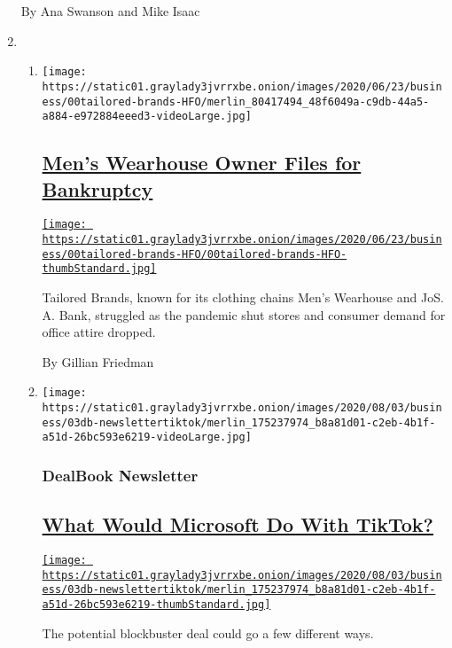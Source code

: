 \begin{enumerate}
  By Ana Swanson and Mike Isaac
\item
  \begin{enumerate}
  \def\labelenumii{\arabic{enumii}.}
  \item
    \texttt{[image: https://static01.graylady3jvrrxbe.onion/images/2020/06/23/business/00tailored-brands-HFO/merlin\_80417494\_48f6049a-c9db-44a5-a884-e972884eeed3-videoLarge.jpg]}

    \hypertarget{mens-wearhouse-owner-files-for-bankruptcy}{%
    \subsection{\texorpdfstring{\href{/2020/08/03/business/tailored-brands-mens-wearhouse-bankruptcy.html}{Men's
    Wearhouse Owner Files for
    Bankruptcy}}{Men's Wearhouse Owner Files for Bankruptcy}}\label{mens-wearhouse-owner-files-for-bankruptcy}}

    \href{/2020/08/03/business/tailored-brands-mens-wearhouse-bankruptcy.html}{\texttt{[image: https://static01.graylady3jvrrxbe.onion/images/2020/06/23/business/00tailored-brands-HFO/00tailored-brands-HFO-thumbStandard.jpg]}}

    Tailored Brands, known for its clothing chains Men's Wearhouse and
    JoS. A. Bank, struggled as the pandemic shut stores and consumer
    demand for office attire dropped.

    By Gillian Friedman
  \item
    \texttt{[image: https://static01.graylady3jvrrxbe.onion/images/2020/08/03/business/03db-newslettertiktok/merlin\_175237974\_b8a81d01-c2eb-4b1f-a51d-26bc593e6219-videoLarge.jpg]}

    \hypertarget{dealbook-newsletter}{%
    \subsubsection{DealBook Newsletter}\label{dealbook-newsletter}}

    \hypertarget{what-would-microsoft-do-with-tiktok}{%
    \subsection{\texorpdfstring{\href{/2020/08/03/business/dealbook/tiktok-microsoft-takeover.html}{What
    Would Microsoft Do With
    TikTok?}}{What Would Microsoft Do With TikTok?}}\label{what-would-microsoft-do-with-tiktok}}

    \href{/2020/08/03/business/dealbook/tiktok-microsoft-takeover.html}{\texttt{[image: https://static01.graylady3jvrrxbe.onion/images/2020/08/03/business/03db-newslettertiktok/merlin\_175237974\_b8a81d01-c2eb-4b1f-a51d-26bc593e6219-thumbStandard.jpg]}}

    The potential blockbuster deal could go a few different ways.
  \end{enumerate}
\end{enumerate}

